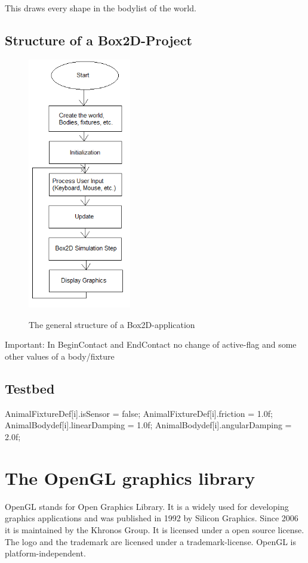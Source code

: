 \documentclass[10pt,a4paper,DIV=11]{scrreprt}
\begin{document}
This draws every shape in the bodylist of the world.

\section{Structure of a Box2D-Project}


\begin{center}
	\begin{figure}[H]
		\centering
		\includegraphics[width=0.4\textwidth,scale=0.5]{files/Box2D-Structure.png}
		\caption{The general structure of a Box2D-application} \cite{box2d-structure}
		\label{fig:box2d-structure}
	\end{figure}
\end{center}



Important: In BeginContact and EndContact no change of active-flag and some other values of a body/fixture


\section{Testbed}


AnimalFixtureDef[i].isSensor = false;
AnimalFixtureDef[i].friction = 1.0f;
AnimalBodydef[i].linearDamping = 1.0f;
AnimalBodydef[i].angularDamping = 2.0f;

\chapter{The OpenGL graphics library}
OpenGL stands for Open Graphics Library. It is a widely used for developing graphics applications and was published in 1992 by Silicon Graphics. Since 2006 it is maintained by the Khronos Group. It is licensed under a open source license. The logo and the trademark are licensed under a trademark-license.
OpenGL is platform-independent.
\end{document}
